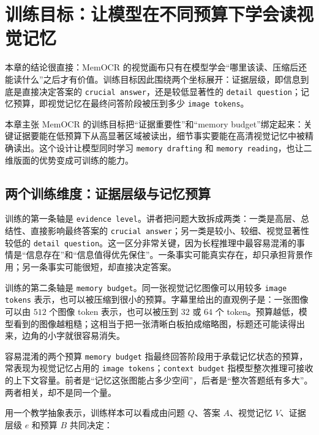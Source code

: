 \section{训练目标：让模型在不同预算下学会读视觉记忆}

本章的结论很直接：MemOCR 的视觉画布只有在模型学会“哪里该读、压缩后还能读什么”之后才有价值。训练目标因此围绕两个坐标展开：证据层级，即信息到底是直接决定答案的 \texttt{crucial answer}，还是较低显著性的 \texttt{detail question}；记忆预算，即视觉记忆在最终问答阶段被压到多少 \texttt{image tokens}。

\begin{importantbox}{本章主张}
MemOCR 的训练目标把“证据重要性”和“memory budget”绑定起来：关键证据要能在低预算下从高显著区域被读出，细节事实要能在高清视觉记忆中被精确读出。这个设计让模型同时学习 \texttt{memory drafting} 和 \texttt{memory reading}，也让二维版面的优势变成可训练的能力。
\end{importantbox}

\subsection{两个训练维度：证据层级与记忆预算}

训练的第一条轴是 \texttt{evidence level}。讲者把问题大致拆成两类：一类是高层、总结性、直接影响最终答案的 \texttt{crucial answer}；另一类是较小、较细、视觉显著性较低的 \texttt{detail question}。这一区分非常关键，因为长程推理中最容易混淆的事情是“信息存在”和“信息值得优先保住”。一条事实可能真实存在，却只承担背景作用；另一条事实可能很短，却直接决定答案。

训练的第二条轴是 \texttt{memory budget}。同一张视觉记忆图像可以用较多 \texttt{image tokens} 表示，也可以被压缩到很小的预算。字幕里给出的直观例子是：一张图像可以由 $512$ 个图像 token 表示，也可以被压到 $32$ 或 $64$ 个 token。预算越低，模型看到的图像越粗糙；这相当于把一张清晰白板拍成缩略图，标题还可能读得出来，边角的小字就很容易消失。

\begin{warningbox}{容易混淆的两个预算}
\texttt{memory budget} 指最终回答阶段用于承载记忆状态的预算，常表现为视觉记忆占用的 \texttt{image tokens}；\texttt{context budget} 指模型整次推理可接收的上下文容量。前者是“记忆这张图能占多少空间”，后者是“整次答题纸有多大”。两者相关，却不是同一个量。
\end{warningbox}

用一个教学抽象表示，训练样本可以看成由问题 $Q$、答案 $A$、视觉记忆 $V$、证据层级 $e$ 和预算 $B$ 共同决定：

